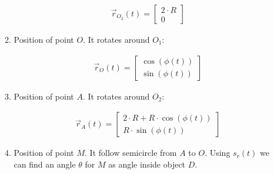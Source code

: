 \begin{enumerate}
\begin{enumerate}
\begin{answer}
\begin{align}
                            \vec{r}_{O_2}(t) = \begin{bmatrix}
                                2 \cdot R \\
                                0
                            \end{bmatrix}
                        \end{align}
                    \end{answer}
              \item Position of point $O$. It rotates around $O_1$:
                    \begin{answer}
                        \begin{align}
                            \vec{r}_{O}(t) = \begin{bmatrix}
                                \cos(\phi(t)) \\
                                \sin(\phi(t))
                            \end{bmatrix}
                        \end{align}
                    \end{answer}
              \item Position of point $A$. It rotates around $O_2$:
                    \begin{answer}
                        \begin{align}
                            \vec{r}_{A}(t) = \begin{bmatrix}
                                2 \cdot R + R \cdot \cos(\phi(t)) \\
                                R \cdot \sin(\phi(t))
                            \end{bmatrix}
                        \end{align}
                    \end{answer}
              \item Position of point $M$. It follow semicircle from $A$ to $O$.
                    Using $s_r(t)$ we can find an angle $\theta$ for $M$ as angle inside object $D$.\\
                    \begin{center}
                    \end{center}


\end{enumerate}
\end{enumerate}
